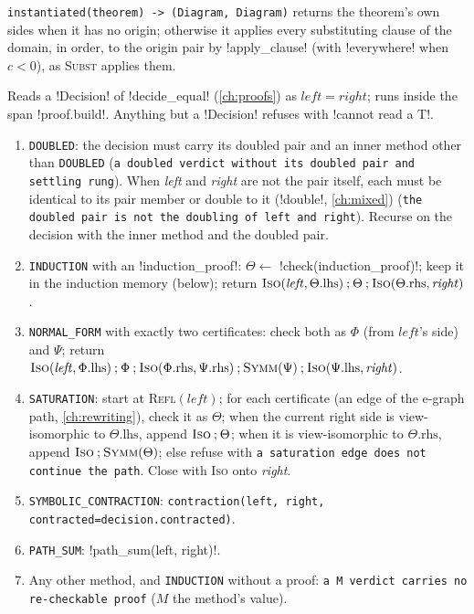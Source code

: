 \texttt{instantiated(\allowbreak{}theorem) -> (\allowbreak{}Diagram,\allowbreak{} Diagram)} returns the theorem's own sides when it has no origin; otherwise it applies every substituting clause of the domain, in order, to the origin pair by \py!apply_clause! (with \code!everywhere! when $c<0$), as \textsc{Subst} applies them.

\begin{algorithm}\label{alg:kernel-from-decision}
Reads a \py!Decision! of \py!decide_equal! (\cref{ch:proofs}) as $\mathit{left}=\mathit{right}$; runs inside the span \code!proof.build!. Anything but a \py!Decision! refuses with \code!cannot read a T!.
\begin{enumerate}
\item \texttt{DOUBLED}: the decision must carry its doubled pair and an inner method other than \texttt{DOUBLED} (\texttt{a doubled verdict without its doubled pair and settling rung}). When \textit{left} and \textit{right} are not the pair itself, each must be identical to its pair member or double to it (\py!double!, \cref{ch:mixed}) (\texttt{the doubled pair is not the doubling of left and right}). Recurse on the decision with the inner method and the doubled pair.
\item \texttt{INDUCTION} with an \py!induction_proof!: $\Theta\gets$ \py!check(induction_proof)!; keep it in the induction memory (below); return $\textsc{Iso}(\mathit{left},\Theta.\mathrm{lhs})\mathbin{;}\Theta\mathbin{;}\textsc{Iso}(\Theta.\mathrm{rhs},\mathit{right})$.
\item \texttt{NORMAL\_FORM} with exactly two certificates: check both as $\Phi$ (from $\mathit{left}$'s side) and $\Psi$; return $\textsc{Iso}(\mathit{left},\Phi.\mathrm{lhs})\mathbin{;}\Phi\mathbin{;}\textsc{Iso}(\Phi.\mathrm{rhs},\Psi.\mathrm{rhs})\mathbin{;}\textsc{Symm}(\Psi)\mathbin{;}\textsc{Iso}(\Psi.\mathrm{lhs},\mathit{right})$.
\item \texttt{SATURATION}: start at \textsc{Refl}$(\mathit{left})$; for each certificate (an edge of the e-graph path, \cref{ch:rewriting}), check it as $\Theta$; when the current right side is view-isomorphic to $\Theta.\mathrm{lhs}$, append $\textsc{Iso}\mathbin{;}\Theta$; when it is view-isomorphic to $\Theta.\mathrm{rhs}$, append $\textsc{Iso}\mathbin{;}\textsc{Symm}(\Theta)$; else refuse with \texttt{a saturation edge does not continue the path}. Close with \textsc{Iso} onto \textit{right}.
\item \texttt{SYMBOLIC\_CONTRACTION}: \texttt{contraction(\allowbreak{}left,\allowbreak{} right,\allowbreak{} contracted=decision.\allowbreak{}contracted)}.
\item \texttt{PATH\_SUM}: \py!path_sum(left, right)!.
\item Any other method, and \texttt{INDUCTION} without a proof: \texttt{a M verdict carries no re-checkable proof} ($M$ the method's value).
\end{enumerate}
\end{algorithm}


